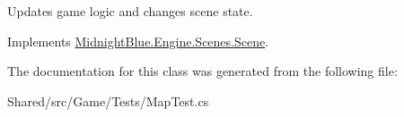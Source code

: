 Updates game logic and changes scene state. 



Implements \hyperlink{class_midnight_blue_1_1_engine_1_1_scenes_1_1_scene_a4e37ff3d5362a8ad5c0d82d7c990dfdf}{Midnight\+Blue.\+Engine.\+Scenes.\+Scene}.



The documentation for this class was generated from the following file\+:\begin{DoxyCompactItemize}
\item 
Shared/src/\+Game/\+Tests/Map\+Test.\+cs\end{DoxyCompactItemize}
